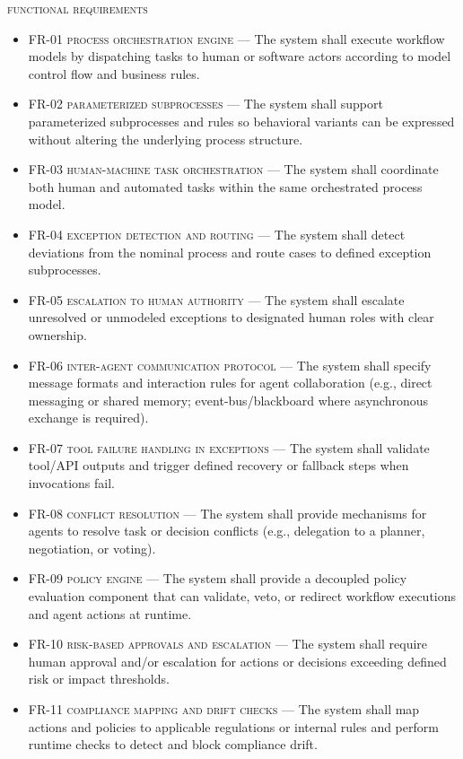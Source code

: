 \begin{footnotesize}
  \textsc{functional requirements}
    \begin{itemize}
        \item \textsc{FR-01 process orchestration engine} --- The system shall execute workflow models by dispatching tasks to human or software actors according to model control flow and business rules.
        \item \textsc{FR-02 parameterized subprocesses} --- The system shall support parameterized subprocesses and rules so behavioral variants can be expressed without altering the underlying process structure.
        \item \textsc{FR-03 human-machine task orchestration} --- The system shall coordinate both human and automated tasks within the same orchestrated process model.
        \item \textsc{FR-04 exception detection and routing} --- The system shall detect deviations from the nominal process and route cases to defined exception subprocesses.
        \item \textsc{FR-05 escalation to human authority} --- The system shall escalate unresolved or unmodeled exceptions to designated human roles with clear ownership.
        \item \textsc{FR-06 inter-agent communication protocol} --- The system shall specify message formats and interaction rules for agent collaboration (e.g., direct messaging or shared memory; event-bus/blackboard where asynchronous exchange is required).
        \item \textsc{FR-07 tool failure handling in exceptions} --- The system shall validate tool/API outputs and trigger defined recovery or fallback steps when invocations fail.
        \item \textsc{FR-08 conflict resolution} --- The system shall provide mechanisms for agents to resolve task or decision conflicts (e.g., delegation to a planner, negotiation, or voting).
        \item \textsc{FR-09 policy engine} --- The system shall provide a decoupled policy evaluation component that can validate, veto, or redirect workflow executions and agent actions at runtime.
        \item \textsc{FR-10 risk-based approvals and escalation} --- The system shall require human approval and/or escalation for actions or decisions exceeding defined risk or impact thresholds.
        \item \textsc{FR-11 compliance mapping and drift checks} --- The system shall map actions and policies to applicable regulations or internal rules and perform runtime checks to detect and block compliance drift.

\end{itemize}
\end{footnotesize}
